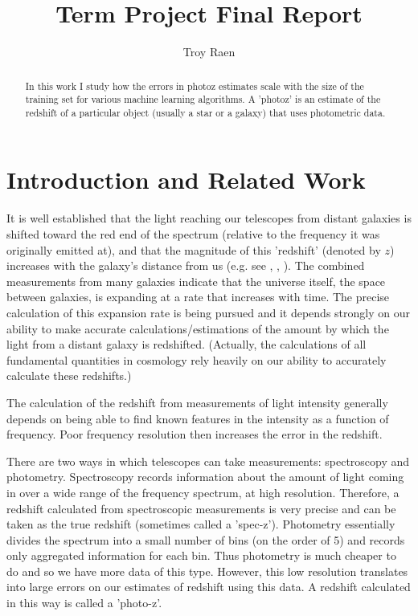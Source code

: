 \documentclass[13pt]{amsart}
\title{Term Project Final Report}
\author{Troy Raen}
\begin{document}
\maketitle



\begin{abstract}
  In this work I study how the errors in photoz estimates scale with the size of the training set for various machine learning algorithms. A 'photoz' is an estimate of the redshift of a particular object (usually a star or a galaxy) that uses photometric data.
\end{abstract}


\section{Introduction and Related Work}

  It is well established that the light reaching our telescopes from distant galaxies is shifted toward the red end of the spectrum (relative to the frequency it was originally emitted at), and that the magnitude of this 'redshift' (denoted by $z$) increases with the galaxy's distance from us (e.g. see \cite{newman}, \cite{graham}, \cite{pzreview}). The combined measurements from many galaxies indicate that the universe itself, the space between galaxies, is expanding at a rate that increases with time. The precise calculation of this expansion rate is being pursued and it depends strongly on our ability to make accurate calculations/estimations of the amount by which the light from a distant galaxy is redshifted. (Actually, the calculations of all fundamental quantities in cosmology rely heavily on our ability to accurately calculate these redshifts.)

  The calculation of the redshift from measurements of light intensity generally depends on being able to find known features in the intensity as a function of frequency. Poor frequency resolution then increases the error in the redshift.

  There are two ways in which telescopes can take measurements: spectroscopy and photometry. Spectroscopy records information about the amount of light coming in over a wide range of the frequency spectrum, at high resolution. Therefore, a redshift calculated from spectroscopic measurements is very precise and can be taken as the true redshift (sometimes called a 'spec-z'). Photometry essentially divides the spectrum into a small number of bins (on the order of 5) and records only aggregated information for each bin. Thus photometry is much cheaper to do and so we have more data of this type. However, this low resolution translates into large errors on our estimates of redshift using this data. A redshift calculated in this way is called a 'photo-z'.
\end{document}
